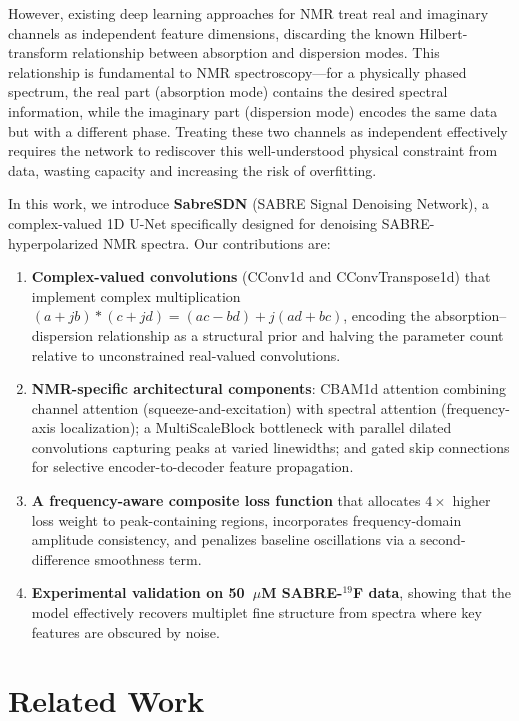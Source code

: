 \documentclass{article}
\begin{document}
However, existing deep learning approaches for NMR treat real and imaginary channels as independent feature dimensions, discarding the known Hilbert-transform relationship between absorption and dispersion modes. This relationship is fundamental to NMR spectroscopy---for a physically phased spectrum, the real part (absorption mode) contains the desired spectral information, while the imaginary part (dispersion mode) encodes the same data but with a different phase. Treating these two channels as independent effectively requires the network to rediscover this well-understood physical constraint from data, wasting capacity and increasing the risk of overfitting.

In this work, we introduce \textbf{SabreSDN} (SABRE Signal Denoising Network), a complex-valued 1D U-Net specifically designed for denoising SABRE-hyperpolarized NMR spectra. Our contributions are:

\begin{enumerate}[leftmargin=*, itemsep=1pt]
    \item \textbf{Complex-valued convolutions} (CConv1d and CConvTranspose1d) that implement complex multiplication $(a+jb)*(c+jd) = (ac-bd) + j(ad+bc)$, encoding the absorption--dispersion relationship as a structural prior and halving the parameter count relative to unconstrained real-valued convolutions.
    \item \textbf{NMR-specific architectural components}: CBAM1d attention combining channel attention (squeeze-and-excitation) with spectral attention (frequency-axis localization); a MultiScaleBlock bottleneck with parallel dilated convolutions capturing peaks at varied linewidths; and gated skip connections for selective encoder-to-decoder feature propagation.
    \item \textbf{A frequency-aware composite loss function} that allocates $4\times$ higher loss weight to peak-containing regions, incorporates frequency-domain amplitude consistency, and penalizes baseline oscillations via a second-difference smoothness term.
    \item \textbf{Experimental validation on 50~$\mu$M SABRE-$^{19}$F data}, showing that the model effectively recovers multiplet fine structure from spectra where key features are obscured by noise.
\end{enumerate}


\section{Related Work}
\end{document}
